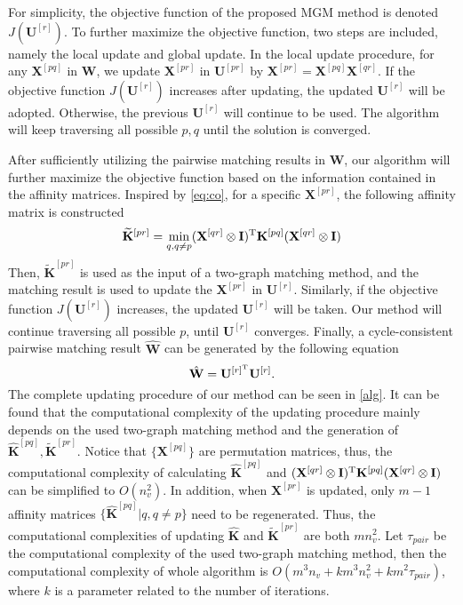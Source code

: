 For simplicity, the objective function of the proposed MGM method is denoted $J(\mathbf U^{[r]})$. To further maximize the objective function, two steps are included, namely the local update and global update. In the local update procedure, for any $\mathbf X^{[pq]}$ in $\mathbf W$, we update $\mathbf X^{[pr]}$ in $\mathbf U^{[pr]}$ by $\mathbf X^{[pr]} = \mathbf X^{[pq]} \mathbf X^{[qr]}$. If the objective function $J(\mathbf U^{[r]})$ increases after updating, the updated $\mathbf U^{[r]}$ will be adopted. Otherwise, the previous $\mathbf U^{[r]}$ will continue to be used. The algorithm will keep traversing all possible $p, q$ until the solution is converged. 

After sufficiently utilizing the pairwise matching results in $\mathbf W$, our algorithm will further maximize the objective function based on the information contained in the affinity matrices. Inspired by \cref{eq:co}, for a specific $\mathbf X^{[pr]}$, the following affinity matrix is constructed
\begin{equation}
    \begin{split}
        \widetilde{\mathbf K}^{[pr]} & = \min_{q, q \neq p} (\mathbf X^{[qr]} \otimes \mathbf I)^{\rm T} \mathbf K^{[pq]} (\mathbf X^{[qr]} \otimes \mathbf I) \\
    \end{split}
    \label{eq:tildeK}
\end{equation}
Then, $\widetilde{\mathbf K}^{[pr]}$ is used as the input of a two-graph matching method, and the matching result is used to update the $\mathbf X^{[pr]}$ in $\mathbf U^{[r]}$. Similarly, if the objective function $J(\mathbf U^{[r]})$ increases, the updated $\mathbf U^{[r]}$ will be taken. Our method will continue traversing all possible $p$, until $\mathbf U^{[r]}$ converges. Finally, a cycle-consistent pairwise matching result $\hat{\mathbf W}$ can be generated by the following equation
\begin{equation}
    \hat{\mathbf W} = \mathbf U^{[r]^{\rm T}} \mathbf U^{[r]}.
\end{equation}
The complete updating procedure of our method can be seen in \cref{alg}. It can be found that the computational complexity of the updating procedure mainly depends on the used two-graph matching method and the generation of $\hat{\mathbf K}^{[pq]}, \widetilde{\mathbf K}^{[pr]}$. Notice that $\{\mathbf X^{[pq]}\}$ are permutation matrices, thus, the computational complexity of calculating $\hat{\mathbf K}^{[pq]}$ and $(\mathbf X^{[qr]} \otimes \mathbf I)^{\rm T} \mathbf K^{[pq]} (\mathbf X^{[qr]} \otimes \mathbf I)$ can be simplified to $O(n_v^2)$. In addition, when $\mathbf X^{[pr]}$ is updated, only $m-1$ affinity matrices $\{\hat{\mathbf K}^{[pq]} |q, q \neq p\}$ need to be regenerated. Thus, the computational complexities of updating $\hat{\mathbf K}$ and $\widetilde{\mathbf K}^{[pr]}$ are both $m n_v^2$. Let $\tau_{pair}$ be the computational complexity of the used two-graph matching method, then the computational complexity of whole algorithm is $O(m^3n_v + k m^3 n_v^2 + k m^2 \tau_{pair})$, where $k$ is a parameter related to the number of iterations.
